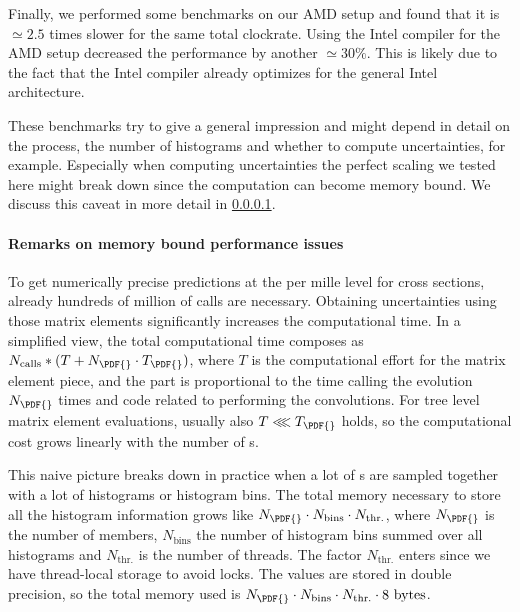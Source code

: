Finally, we performed some benchmarks
on our AMD setup and found that it is $\simeq 2.5$ times slower for the same total clockrate. Using the Intel compiler
for the AMD setup decreased the performance by another $\simeq 30\%$. This is likely due to the fact that the Intel
compiler already optimizes for the general Intel architecture. 

These benchmarks try to give a general impression and might depend in detail on the process, the
number of histograms and whether to compute \PDF{} uncertainties, for example. Especially when computing
\PDF{} uncertainties the perfect scaling we tested here might break down since the computation can become
memory bound. We discuss this caveat in more detail in \cref{subsec:performance}.


\paragraph{Remarks on memory bound performance issues}
\label{subsec:performance}
To get numerically precise predictions at the per mille level for \NNLO{} cross sections,
already hundreds of million of calls are necessary. Obtaining \PDF{} uncertainties using
those \NNLO{} matrix elements significantly increases the computational time. In a simplified view,
the total computational time composes as $N_\text{calls}*(T + N_\PDF{}\cdot T_\PDF{})$, where $T$ is the
computational effort for the matrix element piece, and the \PDF{} part is proportional
to the time calling the \PDF{} evolution $N_\PDF{}$ times and code related to performing the convolutions.
For tree level matrix element evaluations, usually also $T \lll T_\PDF{}$ holds, so the computational cost
grows linearly with the number of \PDF{}s.

This naive picture breaks down in practice when a lot of \PDF{}s
are sampled together with a lot of histograms or histogram bins. The total memory necessary
to store all the histogram information grows like $N_\PDF{} \cdot N_\text{bins} \cdot N_\text{thr.}$,
where $N_\PDF{}$ is the number of \PDF{} members, $N_\text{bins}$ the number of histogram bins
summed over all histograms and $N_\text{thr.}$ is the number of \OMP{} threads. The factor $N_\text{thr.}$
enters since we have thread-local storage to avoid \OMP{} locks.
The values are stored in double precision, so the total memory used is
$N_\PDF{} \cdot N_\text{bins} \cdot N_\text{thr.} \cdot 8 \text{ bytes}$.


